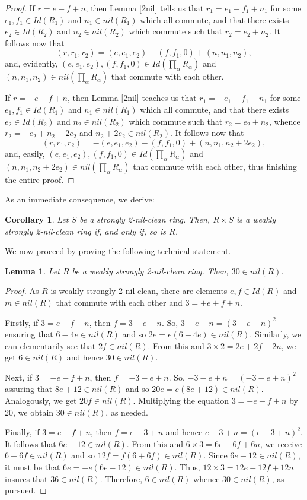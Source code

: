 \documentclass[12pt]{amsart}
\newtheorem{lemma}[theorem]{Lemma}
\newtheorem{corollary}[theorem]{Corollary}
\theoremstyle{definition}
\begin{document}
\begin{proof}
\medskip

 If $r=e-f+n$, then Lemma \ref{2nil} tells us that $r_1=e_1-f_1+n_1$ for some $e_1,f_1\in Id(R_1)$ and $n_1\in nil(R_1)$ which all commute, and that there exists $e_2\in Id(R_2)$ and $n_2\in nil(R_2)$ which commute such that $r_2=e_2+n_2$. It follows now that $$(r,r_1,r_2)=(e,e_1,e_2)-(f,f_1,0)+(n,n_1,n_2),$$ and, evidently, $(e,e_1,e_2),(f,f_1,0)\in Id(\prod_{\alpha} R_{\alpha})$ and $(n,n_1,n_2)\in nil(\prod_{\alpha} R_{\alpha})$ that commute with each other.

\medskip

 If $r=-e-f+n$, then Lemma \ref{2nil} teaches us that $r_1=-e_1-f_1+n_1$ for some $e_1,f_1\in Id(R_1)$ and $n_1\in nil(R_1)$ which all commute, and that there exists $e_2\in Id(R_2)$ and $n_2\in nil(R_2)$ which commute such that $r_2=e_2+n_2$, whence $r_2=-e_2+n_2+2e_2$ and $n_2+2e_2\in nil(R_2)$. It follows now that $$(r,r_1,r_2)=-(e,e_1,e_2)-(f,f_1,0)+(n,n_1,n_2+2e_2),$$ and, easily, $(e,e_1,e_2),(f,f_1,0)\in Id(\prod_{\alpha} R_{\alpha})$ and $(n,n_1,n_2+2e_2)\in nil(\prod_{\alpha} R_{\alpha})$ that commute with each other, thus finishing the entire proof.
\end{proof}

As an immediate consequence, we derive:

\begin{corollary}\label{cor} Let $S$ be a strongly 2-nil-clean ring. Then, $R\times S$ is a weakly strongly 2-nil-clean ring if, and only if, so is $R$.
\end{corollary}

We now proceed by proving the following technical statement.

\begin{lemma}\label{6}
Let $R$ be a weakly strongly 2-nil-clean ring. Then, $30\in nil(R)$.
\end{lemma}

\begin{proof} As $R$ is weakly strongly 2-nil-clean, there are elements $e,f\in Id(R)$ and $m\in nil(R)$ that commute with each other and $3=\pm e\pm f+n$.

Firstly, if $3=e+f+n$, then $f=3-e-n$. So, $3-e-n=(3-e-n)^2$ ensuring that $6-4e\in nil(R)$ and so $2e=e(6-4e)\in nil(R)$. Similarly, we can elementarily see that $2f\in nil(R)$. From this and $3\times 2=2e+2f+2n$, we get $6\in nil(R)$ and hence $30\in nil(R)$.

Next, if $3=-e-f+n$, then $f=-3-e+n$. So, $-3-e+n=(-3-e+n)^2$ assuring that $8e+12\in nil(R)$ and so $20e=e(8e+12)\in nil(R)$. Analogously, we get $20f\in nil(R)$. Multiplying the equation $3=-e-f+n$ by $20$, we obtain $30\in nil(R)$, as needed.

Finally, if $3=e-f+n$, then $f=e-3+n$ and hence $e-3+n=(e-3+n)^2$. It follows that $6e-12\in nil(R)$. From this and $6\times 3=6e-6f+6n$, we receive $6+6f\in nil(R)$ and so $12f=f(6+6f)\in nil(R)$. Since $6e-12\in nil(R)$, it must be that $6e=-e(6e-12)\in nil(R)$. Thus, $12\times 3=12e-12f+12n$ insures that $36\in nil(R)$. Therefore, $6\in nil(R)$ whence $30\in nil(R)$, as pursued.
\end{proof}
\end{document}
